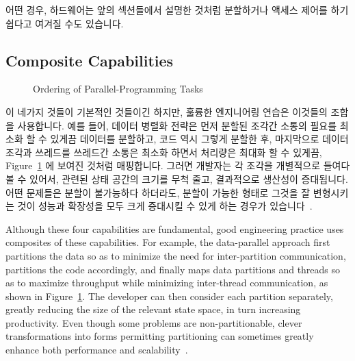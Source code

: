 어떤 경우, 하드웨어는 앞의 섹션들에서 설명한 것처럼 분할하거나 액세스 제어를
하기 쉽다고 여겨질 수도 있습니다.

\subsection{Composite Capabilities}
\label{sec:Composite Capabilities}

\begin{figure}[tb]
\centering
{}
\caption{Ordering of Parallel-Programming Tasks}
\label{fig:intro:Ordering of Parallel-Programming Tasks}
\end{figure}

이 네가지 것들이 기본적인 것들이긴 하지만, 훌륭한 엔지니어링 연습은 이것들의
조합을 사용합니다.
예를 들어, 데이터 병렬화 전략은 먼저 분할된 조각간 소통의 필요를 최소화 할 수
있게끔 데이터를 분할하고, 코드 역시 그렇게 분할한 후, 마지막으로 데이터 조각과
쓰레드를 쓰레드간 소통은 최소화 하면서 처리량은 최대화 할 수 있게끔,
Figure~\ref{fig:intro:Ordering of Parallel-Programming Tasks} 에 보여진 것처럼
매핑합니다.
그러면 개발자는 각 조각을 개별적으로 들여다 볼 수 있어서, 관련된 상태 공간의
크기를 무척 줄고, 결과적으로 생산성이 증대됩니다.
어떤 문제들은 분할이 불가능하다 하더라도, 분할이 가능한 형태로 그것을 잘
변형시키는 것이 성능과 확장성을 모두 크게 증대시킬 수 있게 하는 경우가
있습니다~\cite{PanagiotisMetaxas1999PDCS}.

\iffalse

Although these four capabilities are fundamental,
good engineering practice uses composites of
these capabilities.
For example, the data-parallel approach first
partitions the data so as to minimize the need for
inter-partition communication, partitions the code accordingly,
and finally maps data partitions and threads so as to maximize
throughput while minimizing inter-thread communication,
as shown in
Figure~\ref{fig:intro:Ordering of Parallel-Programming Tasks}.
The developer can then
consider each partition separately, greatly reducing the size
of the relevant state space, in turn increasing productivity.
Even though some problems are non-partitionable,
clever transformations into forms permitting partitioning can
sometimes greatly enhance
both performance and scalability~\cite{PanagiotisMetaxas1999PDCS}.

